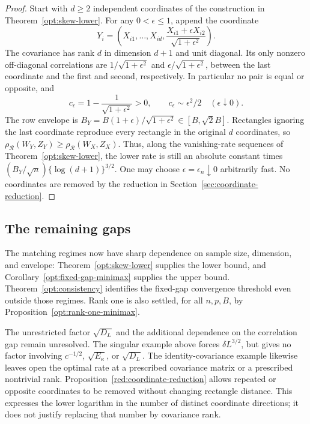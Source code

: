 \documentclass[11pt,a4paper]{article}
\theoremstyle{remark}
\newcommand{\rh}{\rho_{\mathcal R}}
\begin{document}
\begin{proof}
Start with \(d\ge2\) independent coordinates of the construction in
Theorem~\ref{opt:skew-lower}. For any \(0<\epsilon\le1\), append the
coordinate
\[
 Y_i=\left(X_{i1},\ldots,X_{id},
       \frac{X_{i1}+\epsilon X_{i2}}{\sqrt{1+\epsilon^2}}\right).
\]
The covariance has rank \(d\) in dimension \(d+1\) and unit diagonal.
Its only nonzero off-diagonal correlations are
\(1/\sqrt{1+\epsilon^2}\) and
\(\epsilon/\sqrt{1+\epsilon^2}\), between the last coordinate and
the first and second, respectively. In particular no pair is equal or
opposite, and
\[
 c_\epsilon=1-\frac1{\sqrt{1+\epsilon^2}}>0,
 \qquad c_\epsilon\sim\epsilon^2/2\quad(\epsilon\downarrow0).
\]
The row envelope is
\(B_Y=B(1+\epsilon)/\sqrt{1+\epsilon^2}\in[B,\sqrt2B]\).
Rectangles ignoring the last coordinate reproduce every rectangle in
the original \(d\) coordinates, so
\(\rh(W_Y,Z_Y)\ge\rh(W_X,Z_X)\). Thus, along the vanishing-rate
sequences of Theorem~\ref{opt:skew-lower}, the lower rate is still an
absolute constant times
\((B_Y/\sqrt n)\{\log(d+1)\}^{3/2}\). One may choose
\(\epsilon=\epsilon_n\downarrow0\) arbitrarily fast. No coordinates
are removed by the reduction in Section~\ref{sec:coordinate-reduction}.
\end{proof}

\subsection{The remaining gaps}
\label{opt:remaining}

The matching regimes now have sharp dependence on sample size,
dimension, and envelope: Theorem~\ref{opt:skew-lower} supplies the
lower bound, and Corollary~\ref{opt:fixed-gap-minimax} supplies the upper
bound. Theorem~\ref{opt:consistency} identifies the fixed-gap convergence
threshold even outside those regimes. Rank one is also settled, for
all \(n,p,B\), by Proposition~\ref{opt:rank-one-minimax}.

The unrestricted factor \(\sqrt{D_L}\) and the additional dependence
on the correlation gap remain unresolved. The singular example above
forces \(\delta L^{3/2}\), but gives no factor involving
\(c^{-1/2}\), \(\sqrt{E_\kappa}\), or \(\sqrt{D_L}\). The
identity-covariance example likewise leaves open the optimal rate at a
prescribed covariance matrix or a prescribed nontrivial rank.
Proposition~\ref{red:coordinate-reduction} allows repeated or opposite
coordinates to be removed without changing rectangle distance.
This expresses the lower logarithm in the number of distinct coordinate
directions; it does not justify replacing that number by covariance
rank.
\end{document}
